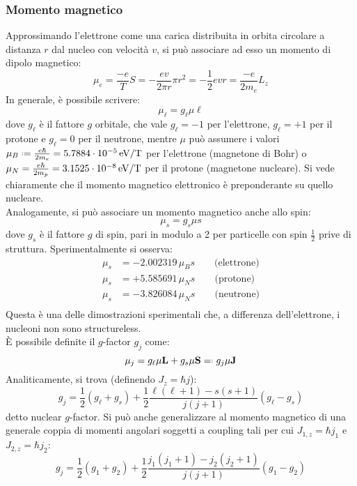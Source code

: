 \subsubsection{Momento magnetico}

Approssimando l'elettrone come una carica distribuita in orbita circolare a distanza $ r $ dal nucleo con velocità $ v $, si può associare ad esso un momento di dipolo magnetico:
\begin{equation}
	\mu_e = \frac{-e}{T} S = - \frac{ev}{2\pi r} \pi r^2 = - \frac{1}{2} e v r = \frac{-e}{2 m_e} L_z
	\label{eq:1.35}
\end{equation}
In generale, è possibile scrivere:
\begin{equation}
	\mu_{\ell} = g_{\ell} \mu \ell
	\label{eq:1.36}
\end{equation}
dove $ g_{\ell} $ è il fattore $ g $ orbitale, che vale $ g_{\ell} = -1 $ per l'elettrone, $ g_{\ell} = +1 $ per il protone e $ g_{\ell} = 0 $ per il neutrone, mentre $ \mu $ può assumere i valori $ \mu_B \defeq \frac{e\hbar}{2m_e} = 5.7884\cdot10^{-5}\ev/\text{T} $ per l'elettrone (magnetone di Bohr) o $ \mu_N = \frac{e\hbar}{2m_p} = 3.1525\cdot10^{-8}\,\mathrm{eV}/\text{T} $ per il protone (magnetone nucleare). Si vede chiaramente che il momento magnetico elettronico è preponderante su quello nucleare.\\
Analogamente, si può associare un momento magnetico anche allo spin:
\begin{equation}
	\mu_s = g_s \mu s
	\label{eq:1.37}
\end{equation}
dove $ g_s $ è il fattore $ g $ di spin, pari in modulo a 2 per particelle con spin $ \frac{1}{2} $ prive di struttura. Sperimentalmente si osserva:
\begin{align*}
	\mu_s &= -2.002319\, \mu_B s \qquad\text{(elettrone)} \\
	\mu_s &= +5.585691\, \mu_N s \qquad \text{(protone)} \\
	\mu_s &= -3.826084\, \mu_N s \qquad \text{(neutrone)} \\
\end{align*}
Questa è una delle dimostrazioni sperimentali che, a differenza dell'elettrone, i nucleoni non sono structureless.\\
È possibile definite il $ g $-factor $ g_j $ come:
\begin{equation}
	\ve{\mu}_j = g_{\ell} \mu \ve{L} + g_s \mu \ve{S} \eqdef g_j \mu \ve{J}
	\label{eq:1.38}
\end{equation}
Analiticamente, si trova (definendo $ J_z = \hbar j $):
\begin{equation}
	g_j = \frac{1}{2} \left( g_{\ell} + g_s \right) + \frac{1}{2} \frac{\ell (\ell + 1) - s (s + 1)}{j (j + 1)} \left( g_{\ell} - g_s \right)
	\label{eq:1.39}
\end{equation}
detto nuclear $ g $-factor. Si può anche generalizzare al momento magnetico di una generale coppia di momenti angolari soggetti a coupling tali per cui $ J_{1,z} = \hbar j_1 $ e $ J_{2,z} = \hbar j_2 $:
\begin{equation}
	g_j = \frac{1}{2} \left( g_1 + g_2 \right) + \frac{1}{2} \frac{j_1 (j_1 + 1) - j_2 (j_2 + 1)}{j (j + 1)} \left( g_1 - g_2 \right)
	\label{eq:1.40}
\end{equation}

